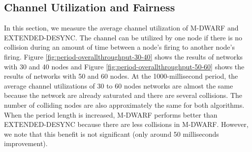 \subsection{Channel Utilization and Fairness}
In this section, we measure the average channel utilization of M-DWARF and EXTENDED-DESYNC. The channel can be utilized by one node if there is no collision during an amount of time between a node's firing to another node's firing. 
Figure \ref{fig:period-overallthroughput-30-40} shows the results of networks with 30 and 40 nodes and Figure \ref{fig:period-overallthroughput-50-60} shows the results of networks with 50 and 60 nodes.
At the 1000-millisecond period, the average channel utilizations of 30 to 60 nodes networks are almost the same because the network are already saturated and there are several collisions. The number of colliding nodes are also approximately the same for both algorithms.
When the period length is increased, M-DWARF performs better than EXTENDED-DESYNC because there are less collisions in M-DWARF. However, we note that this benefit is not significant (only around 50 milliseconds improvement).


